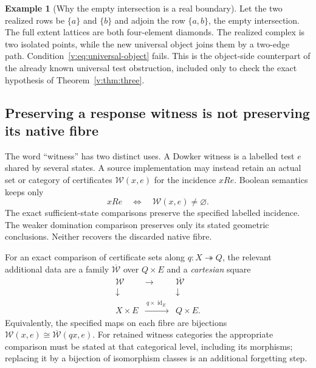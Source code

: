 \documentclass[11pt]{article}
\theoremstyle{definition}
\newtheorem{example}[theorem]{Example}
\theoremstyle{remark}\newtheorem{remark}[theorem]{Remark}
\newcommand{\id}{\operatorname{id}}
\begin{document}
\begin{example}[Why the empty intersection is a real boundary]
Let the two realized rows be $\{a\}$ and $\{b\}$ and adjoin the row
$\{a,b\}$, the empty intersection. The full extent lattices are both
four-element diamonds. The realized complex is two isolated points, while
the new universal object joins them by a two-edge path. Condition~\eqref{v:eq:universal-object}
fails. This is the object-side counterpart of the already known universal
test obstruction, included only to check the exact hypothesis of
Theorem~\ref{v:thm:three}.
\end{example}

\subsection{Preserving a response witness is not preserving its native fibre}
The word ``witness'' has two distinct uses. A Dowker witness is a labelled
test $e$ shared by several states. A source implementation may instead
retain an actual set or category of certificates $\mathcal W(x,e)$ for
the incidence $xRe$. Boolean semantics keeps only
\begin{equation}
 xRe\quad\Longleftrightarrow\quad\mathcal W(x,e)\ne\varnothing.
 \label{v:eq:support}
\end{equation}
The exact sufficient-state comparisons preserve the specified labelled
incidence. The weaker domination comparison preserves only its stated
geometric conclusions. Neither recovers the discarded native fibre.

For an exact comparison of certificate sets along $q:X\twoheadrightarrow
Q$, the relevant additional data are a family $\overline{\mathcal W}$
over $Q\times E$ and a \emph{cartesian} square
\begin{equation}
\begin{array}{ccc}
 \mathcal W&\longrightarrow&\overline{\mathcal W}\\
 \downarrow&&\downarrow\\
 X\times E&\xrightarrow{\ q\times\id_E\ }&Q\times E.
\end{array}
 \label{v:eq:cartesian}
\end{equation}
Equivalently, the specified maps on each fibre are bijections
$\mathcal W(x,e)\cong\overline{\mathcal W}(qx,e)$.
For retained witness categories the appropriate comparison must be stated
at that categorical level, including its morphisms; replacing it by a
bijection of isomorphism classes is an additional forgetting step.
\end{document}
